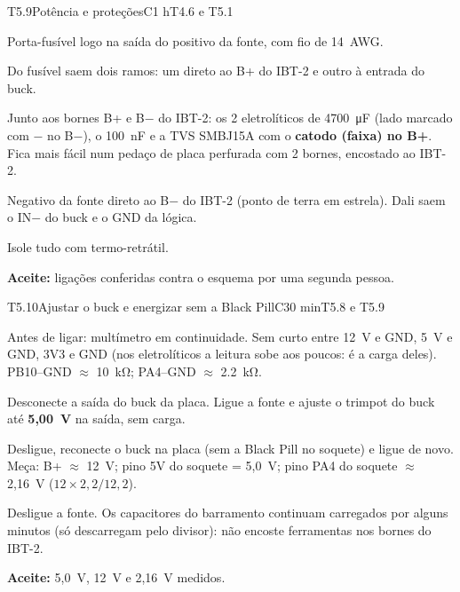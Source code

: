\documentclass[11pt,a4paper]{article}
\newcommand{\aprox}{\ensuremath{\approx}}
\begin{document}
\begin{tarefa}{T5.9}{Potência e proteções}{C}{1 h}{T4.6 e T5.1}
\begin{passos}
  \item Porta-fusível logo na saída do positivo da fonte, com fio de 14~AWG.
  \item Do fusível saem dois ramos: um direto ao B+ do IBT-2 e outro à entrada do buck.
  \item Junto aos bornes B+ e B$-$ do IBT-2: os 2 eletrolíticos de \qty{4700}{\micro\farad}
    (lado marcado com $-$ no B$-$), o \qty{100}{\nano\farad} e a TVS SMBJ15A com o
    \textbf{catodo (faixa) no B+}. Fica mais fácil num pedaço de placa perfurada com 2
    bornes, encostado ao IBT-2.
  \item Negativo da fonte direto ao B$-$ do IBT-2 (ponto de terra em estrela). Dali saem o
    IN$-$ do buck e o GND da lógica.
  \item Isole tudo com termo-retrátil.
\end{passos}
\textbf{Aceite:} ligações conferidas contra o esquema por uma segunda pessoa.
\end{tarefa}

\begin{tarefa}{T5.10}{Ajustar o buck e energizar sem a Black Pill}{C}{30 min}{T5.8 e T5.9}
\begin{passos}
  \item Antes de ligar: multímetro em continuidade. Sem curto entre 12~V e GND, 5~V e GND,
    3V3 e GND (nos eletrolíticos a leitura sobe aos poucos: é a carga deles). PB10--GND
    \aprox{} \qty{10}{\kilo\ohm}; PA4--GND \aprox{} \qty{2,2}{\kilo\ohm}.
  \item Desconecte a saída do buck da placa. Ligue a fonte e ajuste o trimpot do buck até
    \textbf{5,00~V} na saída, sem carga.
  \item Desligue, reconecte o buck na placa (sem a Black Pill no soquete) e ligue de novo.
    Meça: B+ \aprox{} 12~V; pino 5V do soquete = 5,0~V; pino PA4 do soquete \aprox{}
    2,16~V ($12 \times 2{,}2 / 12{,}2$).
  \item Desligue a fonte. Os capacitores do barramento continuam carregados por alguns
    minutos (só descarregam pelo divisor): não encoste ferramentas nos bornes do IBT-2.
\end{passos}
\textbf{Aceite:} 5,0~V, 12~V e 2,16~V medidos.
\end{tarefa}
\end{document}
